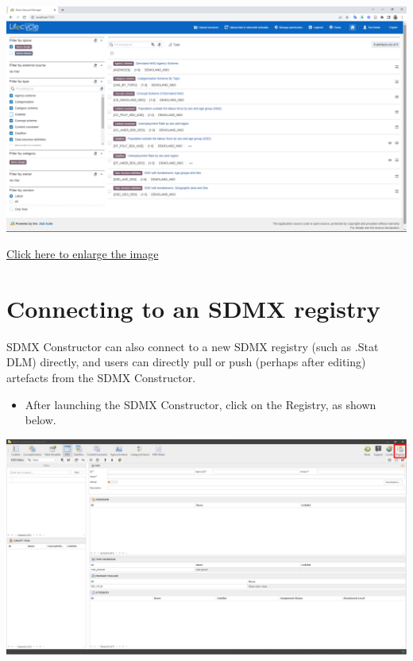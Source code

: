 \documentclass[
]{book}
\providecommand{\tightlist}{%
  \setlength{\itemsep}{0pt}\setlength{\parskip}{0pt}}
\begin{document}
\begin{center}\includegraphics[width=1\linewidth]{./images/image206} \end{center}

\href{images/image206.png}{Click here to enlarge the image}

\hypertarget{connecting-to}{%
\section{Connecting to an SDMX registry}\label{connecting-to}}

SDMX Constructor can also connect to a new SDMX registry (such as .Stat DLM) directly, and users can directly pull or push (perhaps after editing) artefacts from the SDMX Constructor.

\begin{itemize}
\tightlist
\item
  After launching the SDMX Constructor, click on the Registry, as shown below.
\end{itemize}

\begin{center}\includegraphics[width=1\linewidth]{./images/image208} \end{center}
\end{document}
